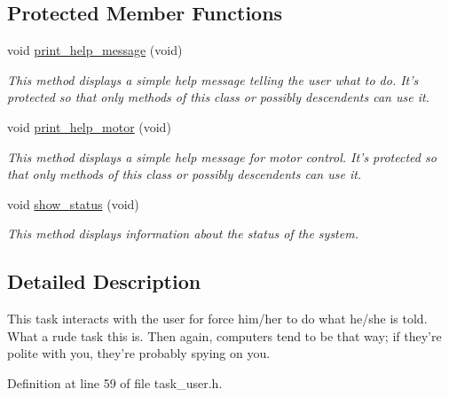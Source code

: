 \subsection*{Protected Member Functions}
\begin{DoxyCompactItemize}
\item 
void \hyperlink{classtask__user_a75475060f83bae1e44bcc8a5c34015c7}{print\-\_\-help\-\_\-message} (void)
\begin{DoxyCompactList}\small\item\em This method displays a simple help message telling the user what to do. It's protected so that only methods of this class or possibly descendents can use it. \end{DoxyCompactList}\item 
void \hyperlink{classtask__user_a3335e91f3ab99389b30789ec221c9eed}{print\-\_\-help\-\_\-motor} (void)
\begin{DoxyCompactList}\small\item\em This method displays a simple help message for motor control. It's protected so that only methods of this class or possibly descendents can use it. \end{DoxyCompactList}\item 
void \hyperlink{classtask__user_a105bebbd9cb1031154c3dfc3662db4a0}{show\-\_\-status} (void)
\begin{DoxyCompactList}\small\item\em This method displays information about the status of the system. \end{DoxyCompactList}\end{DoxyCompactItemize}


\subsection{Detailed Description}
This task interacts with the user for force him/her to do what he/she is told. What a rude task this is. Then again, computers tend to be that way; if they're polite with you, they're probably spying on you. 

Definition at line 59 of file task\-\_\-user.\-h.



